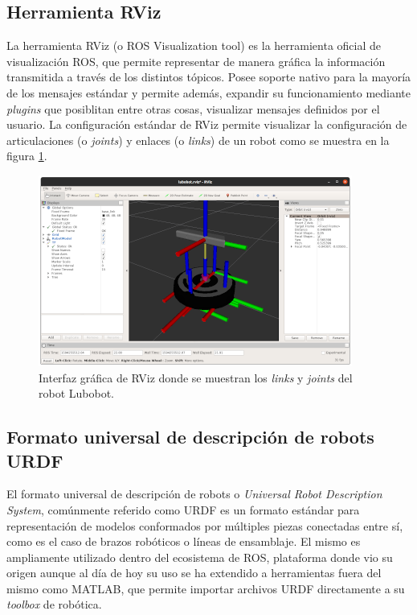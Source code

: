 \subsection{Herramienta RViz}

La herramienta RViz (o ROS Visualization tool) es la herramienta oficial de visualización ROS, que permite representar de manera gráfica la información transmitida a través de los distintos tópicos. Posee soporte nativo para la mayoría de los mensajes estándar y permite además, expandir su funcionamiento mediante \textit{plugins} que posiblitan entre otras cosas, visualizar mensajes definidos por el usuario. La configuración estándar de RViz permite visualizar la configuración de articulaciones (o \textit{joints}) y enlaces (o \textit{links}) de un robot como se muestra en la figura \ref{fig:rviz}.

\begin{figure}[ht]
    \centering
    \includegraphics{./Figures/rviz.png}
    \caption{Interfaz gráfica de RViz donde se muestran los \textit{links} y \textit{joints} del robot Lubobot.}
    \label{fig:rviz}
\end{figure}


\subsection{Formato universal de descripción de robots URDF}

El formato universal de descripción de robots o \textit{Universal Robot Description System}, comúnmente referido como URDF es un formato estándar para representación de modelos conformados por múltiples piezas conectadas entre sí, como es el caso de brazos robóticos o líneas de ensamblaje. El mismo es ampliamente utilizado dentro del ecosistema de ROS, plataforma donde vio su origen aunque al día de hoy su uso se ha extendido a herramientas fuera del mismo como MATLAB, que permite importar archivos URDF directamente a su \textit{toolbox} de robótica.

